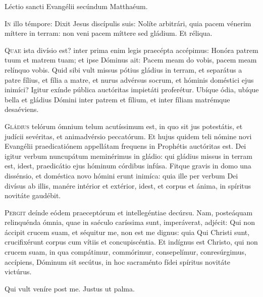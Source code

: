 \horaNocturnusIII

Léctio sancti Evangélii secúndum Matthaéum.


\lettrine{I}{n} illo témpore:
Dixit Jesus discípulis suis:
Nolíte arbitrári, quia pacem vénerim míttere in terram:
non veni pacem míttere sed gládium.
Et réliqua.


\lettrine{Q}{uae} ista divísio est?
inter prima enim legis praecépta accépimus:
Honóra patrem tuum et matrem tuam;
et ipse Dóminus ait:
Pacem meam do vobis, pacem meam relínquo vobis.
Quid sibi vult missus pótius gládius in terram,
et separátus a patre fílius, et fília a matre,
et nurus advérsus socrum, et hóminis doméstici ejus inimíci?
Igitur exínde pública auctóritas impietáti proferétur.
Ubíque ódia, ubíque bella et gládius Dómini inter patrem et fílium,
et inter fíliam matrémque desaéviens.



\lettrine{G}{ládius} telórum ómnium telum acutíssimum est,
in quo sit jus potestátis, et judícii sevéritas,
et animadvérsio peccatórum.
Et hujus quidem teli nómine novi Evangélii praedicatiónem
appellátam frequens in Prophétis auctóritas est.
Dei igitur verbum nuncupátum meminérimus in gládio:
qui gládius missus in terram est, idest,
praedicátio ejus hóminum córdibus infúsa.
Fitque gravis in domo una dissénsio,
et doméstica novo hómini erunt inimíca:
quia ille per verbum Dei divísus ab illis,
manére intérior et extérior, idest,
et corpus et ánima, in spíritus novitáte gaudébit.


\lettrine{P}{ergit} deínde eódem praeceptórum et intellegéntiae
decúrsu. Nam, posteáquam relinquénda ómnia,
quae in saéculo caríssima sunt, imperáverat, adjécit:
Qui non áccipit crucem suam, et séquitur me, non est me dignus:
quia Qui Christi sunt, crucifixérunt corpus cum vítiis
et concupiscéntia.
Et indígnus est Christo, qui non crucem suam, in qua compátimur,
commórimur, consepelímur, conresúrgimus, accípiens,
Dóminum sit secútus, in hoc sacraménto fídei spíritus novitáte
victúrus.

\parsTeDeum

Qui vult veníre post me.
Justus ut palma.
